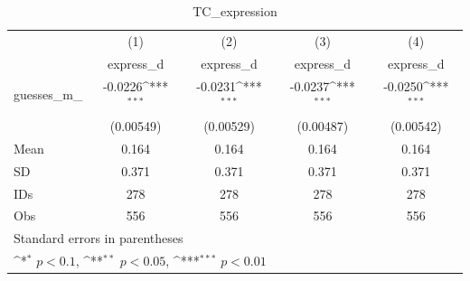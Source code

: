 \begin{table}[htbp]\centering
\def\sym#1{\ifmmode^{#1}\else\(^{#1}\)\fi}
\caption{TC\_expression}
\begin{tabular}{l*{4}{c}}
\hline\hline
                                &\multicolumn{1}{c}{(1)}&\multicolumn{1}{c}{(2)}&\multicolumn{1}{c}{(3)}&\multicolumn{1}{c}{(4)}\\
                                &\multicolumn{1}{c}{express\_d}&\multicolumn{1}{c}{express\_d}&\multicolumn{1}{c}{express\_d}&\multicolumn{1}{c}{express\_d}\\
\hline
guesses\_m\_                      &  -0.0226\sym{***}&  -0.0231\sym{***}&  -0.0237\sym{***}&  -0.0250\sym{***}\\
                                &(0.00549)         &(0.00529)         &(0.00487)         &(0.00542)         \\
\hline
Mean                            &    0.164         &    0.164         &    0.164         &    0.164         \\
SD                              &    0.371         &    0.371         &    0.371         &    0.371         \\
IDs                             &      278         &      278         &      278         &      278         \\
Obs                             &      556         &      556         &      556         &      556         \\
\hline\hline
\multicolumn{5}{l}{\footnotesize Standard errors in parentheses}\\
\multicolumn{5}{l}{\footnotesize \sym{*} \(p<0.1\), \sym{**} \(p<0.05\), \sym{***} \(p<0.01\)}\\
\end{tabular}
\end{table}
